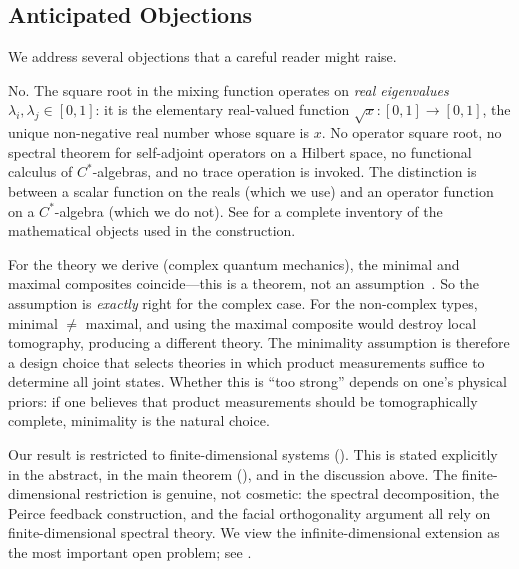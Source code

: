 \subsection{Anticipated Objections}\label{subsec:objections}

We address several objections that a careful reader might raise.

\begin{remark}
\label{rem:sqrt-objection}
No.  The square root in the mixing function operates on \emph{real
eigenvalues} $\lambda_{i}, \lambda_{j} \in [0,1]$: it is the
elementary real-valued function $\sqrt{x} : [0,1] \to [0,1]$, the
unique non-negative real number whose square is $x$.  No operator
square root, no spectral theorem for self-adjoint operators on a
Hilbert space, no functional calculus of $C^{*}$-algebras, and no
trace operation is invoked.  The distinction is between a scalar
function on the reals (which we use) and an operator function on a
$C^{*}$-algebra (which we do not).  See  for a
complete inventory of the mathematical objects used in the
construction.
\end{remark}

\begin{remark}
\label{rem:minimality-objection}
For the theory we derive (complex quantum mechanics), the minimal and
maximal composites coincide---this is a theorem, not an
assumption~\cite{Barnum2023}.  So the assumption is \emph{exactly}
right for the complex case.  For the non-complex types, minimal $\neq$
maximal, and using the maximal composite would destroy local
tomography, producing a different theory.  The minimality assumption is
therefore a design choice that selects theories in which product
measurements suffice to determine all joint states.  Whether this is
``too strong'' depends on one's physical priors: if one believes that
product measurements should be tomographically complete, minimality is
the natural choice.
\end{remark}

\begin{remark}
\label{rem:infty-objection}
Our result is restricted to finite-dimensional systems
().  This is stated explicitly in the abstract, in
the main theorem (), and in the discussion above.  The
finite-dimensional restriction is genuine, not cosmetic: the spectral
decomposition, the Peirce feedback construction, and the facial
orthogonality argument all rely on finite-dimensional spectral theory.
We view the infinite-dimensional extension as the most important open
problem; see .
\end{remark}

